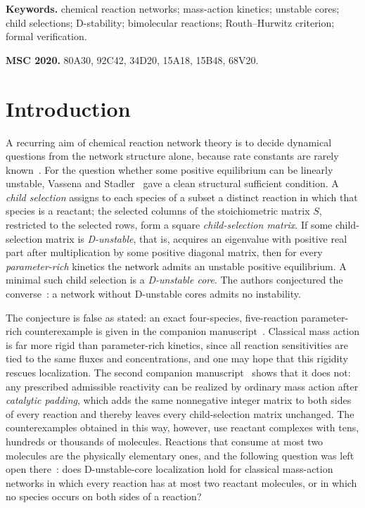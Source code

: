 \documentclass[11pt,a4paper]{article}
\theoremstyle{plain}
\theoremstyle{definition}
\theoremstyle{remark}
\begin{document}
\noindent\textbf{Keywords.} chemical reaction networks; mass-action kinetics; unstable cores; child selections; D-stability; bimolecular reactions; Routh--Hurwitz criterion; formal verification.

\medskip
\noindent\textbf{MSC 2020.} 80A30, 92C42, 34D20, 15A18, 15B48, 68V20.

\section{Introduction}\label{sec:intro}

A recurring aim of chemical reaction network theory is to decide dynamical questions from the network structure alone, because rate constants are rarely known~\cite{Feinberg2019,Clarke1980}. For the question whether some positive equilibrium can be linearly unstable, Vassena and Stadler~\cite{VassenaStadler2024} gave a clean structural sufficient condition. A \emph{child selection} assigns to each species of a subset a distinct reaction in which that species is a reactant; the selected columns of the stoichiometric matrix $S$, restricted to the selected rows, form a square \emph{child-selection matrix}. If some child-selection matrix is \emph{D-unstable}, that is, acquires an eigenvalue with positive real part after multiplication by some positive diagonal matrix, then for every \emph{parameter-rich} kinetics the network admits an unstable positive equilibrium. A minimal such child selection is a \emph{D-unstable core}. The authors conjectured the converse~\cite[Conj.~17]{VassenaStadler2024}: a network without D-unstable cores admits no instability.

The conjecture is false as stated: an exact four-species, five-reaction parameter-rich counterexample is given in the companion manuscript~\cite{ParameterRich2026}. Classical mass action is far more rigid than parameter-rich kinetics, since all reaction sensitivities are tied to the same fluxes and concentrations, and one may hope that this rigidity rescues localization. The second companion manuscript~\cite{KineticOrder2026} shows that it does not: any prescribed admissible reactivity can be realized by ordinary mass action after \emph{catalytic padding}, which adds the same nonnegative integer matrix to both sides of every reaction and thereby leaves every child-selection matrix unchanged. The counterexamples obtained in this way, however, use reactant complexes with tens, hundreds or thousands of molecules. Reactions that consume at most two molecules are the physically elementary ones, and the following question was left open there~\cite[Question~8.1]{KineticOrder2026}: does D-unstable-core localization hold for classical mass-action networks in which every reaction has at most two reactant molecules, or in which no species occurs on both sides of a reaction?
\end{document}
